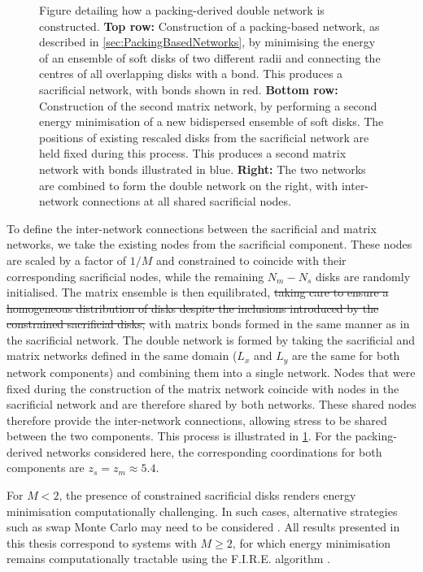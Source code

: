 \documentclass[asymmetricmargins]{library/duthesis}%
\providecommand{\DIFdel}[1]{{\protect\color{red}\sout{#1}}}                      %
\providecommand{\DIFdelbegin}{} %
\providecommand{\DIFdelend}{} %
\begin{document}
\begin{figure}[bt]
{\begin{tikzpicture}
\end{tikzpicture}}
\caption[Figure detailing how a packing-derived double network is constructed]{Figure detailing how a packing-derived double network is constructed. 
{\bf Top row:} Construction of a packing-based network, as described in \cref{sec:PackingBasedNetworks}, by minimising the energy of an ensemble of soft disks of two different radii and connecting the centres of all overlapping disks with a bond. This produces a sacrificial network, with bonds shown in red. \newline
{\bf Bottom row:} Construction of the second matrix network, by performing a second energy minimisation of a new bidispersed ensemble of soft disks. The positions of existing rescaled disks from the sacrificial network are held fixed during this process. This produces a second matrix network with bonds illustrated in blue. \newline
{\bf Right:} The two networks are combined to form the double network on the right, with inter-network connections at all shared sacrificial nodes.}
\label{fig:DoubleJammedNetwork}
\end{figure}

To define the inter-network connections between the sacrificial and matrix networks, we take the existing nodes from the sacrificial component. These nodes are scaled by a factor of $1/M$ and constrained to coincide with their corresponding sacrificial nodes, while the remaining $N_m - N_s$ disks are randomly initialised. The matrix ensemble is then equilibrated, \DIFdelbegin \DIFdel{taking care to ensure a homogeneous distribution of disks despite the inclusions introduced by the constrained sacrificial disks, }\DIFdelend with matrix bonds formed in the same manner as in the sacrificial network. The double network is formed by taking the sacrificial and matrix networks defined in the same domain ($L_x$ and $L_y$ are the same for both network components) and combining them into a single network. Nodes that were fixed during the construction of the matrix network coincide with nodes in the sacrificial network and are therefore shared by both networks. These shared nodes therefore provide the inter-network connections, allowing stress to be shared between the two components. This process is illustrated in \cref{fig:DoubleJammedNetwork}. For the packing-derived networks considered here, the corresponding coordinations for both components are $z_s = z_m \approx 5.4$.

For $M < 2$, the presence of constrained sacrificial disks renders energy minimisation computationally challenging. In such cases, alternative strategies such as swap Monte Carlo may need to be considered \cite{NiklasSwapMonte2023}. All results presented in this thesis correspond to systems with $M \geq 2$, for which energy minimisation remains computationally tractable using the F.I.R.E. algorithm \cite{guenole_assessment_2020}.
\end{document}
